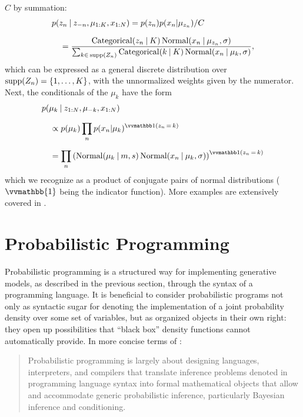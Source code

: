 \(C\) by summation:
\begin{equation}
  \setlength{\jot}{0.8\baselineskip}
  \begin{aligned}
    &p(z_{n} \given z_{-n}, \mu_{1:K}, x_{1:N}) = p(z_{n}) p(x_{n} | \mu_{z_{n}}) / C  \\
    &\quad = \dfrac{\distr{Categorical}(z_{n} \given K) \, \Normal(x_{n} \given \mu_{z_{n}}, \sigma)}{
      \sum_{k \in\, \supp(Z_{n})} \distr{Categorical}(k \given K)\, \Normal(x_{n} \given \mu_{k},
      \sigma)}, \\
  \end{aligned}
\end{equation}
which can be expressed as a general discrete distribution over \(\operatorname{supp}(Z_{n}) = \{1, \ldots, K\}\),
with the unnormalized weights given by the numerator.  Next, the conditionals of the \(\mu_{k}\)
have the form
\begin{equation}
  \setlength{\jot}{0.8\baselineskip}
  \begin{aligned}
    &p(\mu_{k} \given z_{1:N}, \mu_{-k}, x_{1:N}) \\
    &\quad \propto p(\mu_k) \prod_{n} p(x_{n} | \mu_{k})^{\indicator{z_{n} \, = \, k}} \\
    &\quad = \prod_{n} \left( \Normal(\mu_{k} \given m, s) \,
      \Normal(x_{n} \given \mu_{k}, \sigma) \right)^{\indicator{z_{n} \, = \, k}}
  \end{aligned}
\end{equation}
which we recognize as a product of conjugate pairs of normal distributions (\(\vvmathbb{1}\) being the
indicator function).  More examples are extensively covered in \textcite[chapter
24.2]{murphy2012machine}.

\section{Probabilistic Programming}
\label{sec:prob-prog}

Probabilistic programming is a structured way for implementing generative models, as
described in the previous section, through the syntax of a programming language.  It is beneficial
to consider probabilistic programs not only as syntactic sugar for denoting the implementation of a
joint probability density over some set of variables, but as organized objects in their own right:
they open up possibilities that \enquote{black box} density functions cannot automatically
provide. In more concise terms of \textcite{vandemeent2018introduction}:
\begin{quote}
  Probabilistic programming is largely about designing languages, interpreters, and compilers that
  translate inference problems denoted in programming language syntax into formal mathematical
  objects that allow and accommodate generic probabilistic inference, particularly Bayesian
  inference and conditioning.
\end{quote}

